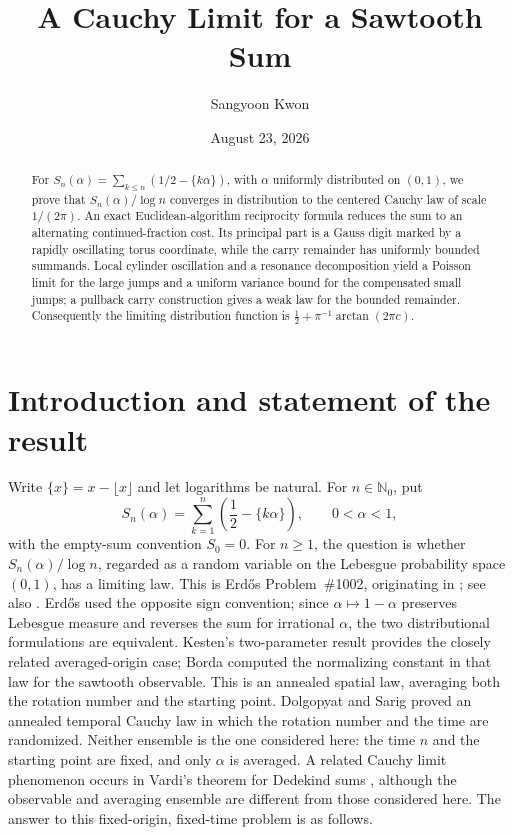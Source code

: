 \documentclass[11pt,a4paper]{amsart}
\title{A Cauchy Limit for a Sawtooth Sum}
\author{Sangyoon Kwon}
\date{August 23, 2026}
\theoremstyle{definition}
\theoremstyle{remark}
\newcommand{\N}{\mathbb N}
\begin{document}
\begin{abstract}
For $S_n(\alpha)=\sum_{k\le n}(1/2-\{k\alpha\})$, with $\alpha$ uniformly distributed on $(0,1)$, we prove that $S_n(\alpha)/\log n$ converges in distribution to the centered Cauchy law of scale $1/(2\pi)$.  An exact Euclidean-algorithm reciprocity formula reduces the sum to an alternating continued-fraction cost.  Its principal part is a Gauss digit marked by a rapidly oscillating torus coordinate, while the carry remainder has uniformly bounded summands.  Local cylinder oscillation and a resonance decomposition yield a Poisson limit for the large jumps and a uniform variance bound for the compensated small jumps; a pullback carry construction gives a weak law for the bounded remainder.  Consequently the limiting distribution function is $\frac12+\pi^{-1}\arctan(2\pi c)$.
\end{abstract}

\maketitle

\section{Introduction and statement of the result}

Write $\{x\}=x-\lfloor x\rfloor$ and let logarithms be natural.  For
$n\in\N_0$, put
\[
 S_n(\alpha)=\sum_{k=1}^{n}\left(\frac12-\{k\alpha\}\right),
 \qquad 0<\alpha<1,
\]
with the empty-sum convention $S_0=0$.  For $n\ge1$, the question is whether
$S_n(\alpha)/\log n$, regarded as a random variable on
the Lebesgue probability space $(0,1)$, has a limiting law.  This is
Erd\H{o}s Problem~\#1002, originating in \cite{Er64b}; see also
\cite{Bloom1002}.  Erd\H{o}s used the opposite sign convention; since
$\alpha\mapsto1-\alpha$ preserves Lebesgue measure and reverses the
sum for irrational $\alpha$, the two distributional formulations are
equivalent.  Kesten's two-parameter result \cite{Ke60} provides the
closely related averaged-origin case; Borda \cite{Borda25} computed the
normalizing constant in that law for the sawtooth observable.  This is an
annealed spatial law, averaging both the rotation number and the starting
point.  Dolgopyat and Sarig \cite{DS20} proved an annealed temporal Cauchy
law in which the rotation number and the time are randomized.  Neither
ensemble is the one considered here: the time $n$ and the starting point are
fixed, and only $\alpha$ is averaged.  A related Cauchy limit phenomenon
occurs in Vardi's theorem for Dedekind sums \cite{Vardi93}, although the
observable and averaging ensemble are different from those considered here.
The answer to this
fixed-origin, fixed-time problem is as follows.
\end{document}
